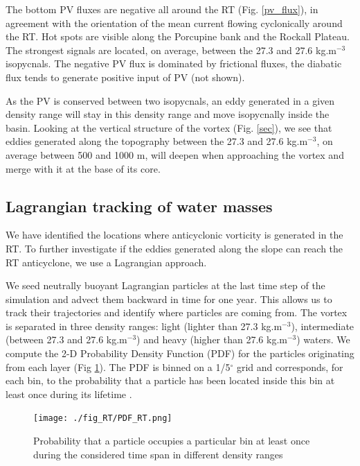 \documentclass[11pt,a4paper]{article}
\begin{document}
The bottom PV fluxes are negative all around the RT (Fig. \ref{pv_flux}), in agreement with the orientation of the mean current flowing cyclonically around the RT. Hot spots are visible along the Porcupine bank and the Rockall Plateau. The strongest signals are located, on average, between the 27.3 and 27.6 kg.m$^{-3}$ isopycnals. The negative PV flux is dominated by frictional fluxes, the diabatic flux tends to generate positive input of PV (not shown). 


As the PV is conserved between two isopycnals, an eddy generated in a given density range will stay in this density range and move isopycnally inside the basin. Looking at the vertical structure of the vortex (Fig. \ref{sec}), we see that eddies generated along the topography between the 27.3 and 27.6 kg.m$^{-3}$, on average between 500 and 1000 m, will deepen when approaching the vortex and merge with it at the base of its core.



\subsection{Lagrangian tracking of water masses}

We have identified the locations where anticyclonic vorticity is generated in the RT. To further investigate if the eddies generated along the slope can reach the RT anticyclone, we use a Lagrangian approach. 


We seed neutrally buoyant Lagrangian particles at the last time step of the simulation and advect them backward in time for one year. This allows us to track their trajectories and identify where particles are coming from. The vortex is separated in three density ranges: light (lighter than 27.3 kg.m$^{-3}$), intermediate (between 27.3 and 27.6 kg.m$^{-3}$) and heavy (higher than 27.6 kg.m$^{-3}$) waters. We compute the 2-D Probability Density Function (PDF) for the particles originating from each layer (Fig \ref{PDF}). The PDF is binned on a 1/5$^{\circ}$ grid and corresponds, for each bin, to the probability that a particle has been located inside this bin at least once during its lifetime \cite{vansebille}.

\begin{figure}[H]
\centerline{\texttt{[image: ./fig\_RT/PDF\_RT.png]}}
\caption{Probability that a particle occupies a particular bin at least once during the considered time span in different density ranges}
\label{PDF}
\end{figure}
\end{document}
